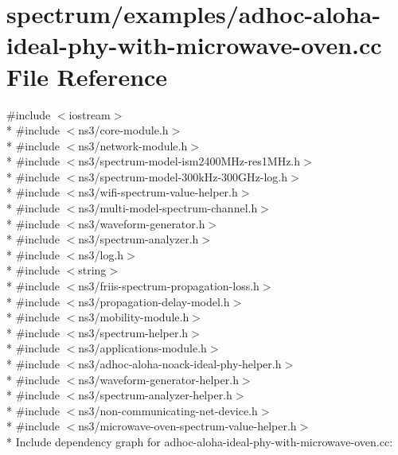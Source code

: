 \hypertarget{adhoc-aloha-ideal-phy-with-microwave-oven_8cc}{}\section{spectrum/examples/adhoc-\/aloha-\/ideal-\/phy-\/with-\/microwave-\/oven.cc File Reference}
\label{adhoc-aloha-ideal-phy-with-microwave-oven_8cc}
{\ttfamily \#include $<$iostream$>$}\\*
{\ttfamily \#include $<$ns3/core-\/module.\+h$>$}\\*
{\ttfamily \#include $<$ns3/network-\/module.\+h$>$}\\*
{\ttfamily \#include $<$ns3/spectrum-\/model-\/ism2400\+M\+Hz-\/res1\+M\+Hz.\+h$>$}\\*
{\ttfamily \#include $<$ns3/spectrum-\/model-\/300k\+Hz-\/300\+G\+Hz-\/log.\+h$>$}\\*
{\ttfamily \#include $<$ns3/wifi-\/spectrum-\/value-\/helper.\+h$>$}\\*
{\ttfamily \#include $<$ns3/multi-\/model-\/spectrum-\/channel.\+h$>$}\\*
{\ttfamily \#include $<$ns3/waveform-\/generator.\+h$>$}\\*
{\ttfamily \#include $<$ns3/spectrum-\/analyzer.\+h$>$}\\*
{\ttfamily \#include $<$ns3/log.\+h$>$}\\*
{\ttfamily \#include $<$string$>$}\\*
{\ttfamily \#include $<$ns3/friis-\/spectrum-\/propagation-\/loss.\+h$>$}\\*
{\ttfamily \#include $<$ns3/propagation-\/delay-\/model.\+h$>$}\\*
{\ttfamily \#include $<$ns3/mobility-\/module.\+h$>$}\\*
{\ttfamily \#include $<$ns3/spectrum-\/helper.\+h$>$}\\*
{\ttfamily \#include $<$ns3/applications-\/module.\+h$>$}\\*
{\ttfamily \#include $<$ns3/adhoc-\/aloha-\/noack-\/ideal-\/phy-\/helper.\+h$>$}\\*
{\ttfamily \#include $<$ns3/waveform-\/generator-\/helper.\+h$>$}\\*
{\ttfamily \#include $<$ns3/spectrum-\/analyzer-\/helper.\+h$>$}\\*
{\ttfamily \#include $<$ns3/non-\/communicating-\/net-\/device.\+h$>$}\\*
{\ttfamily \#include $<$ns3/microwave-\/oven-\/spectrum-\/value-\/helper.\+h$>$}\\*
Include dependency graph for adhoc-\/aloha-\/ideal-\/phy-\/with-\/microwave-\/oven.cc\+:
